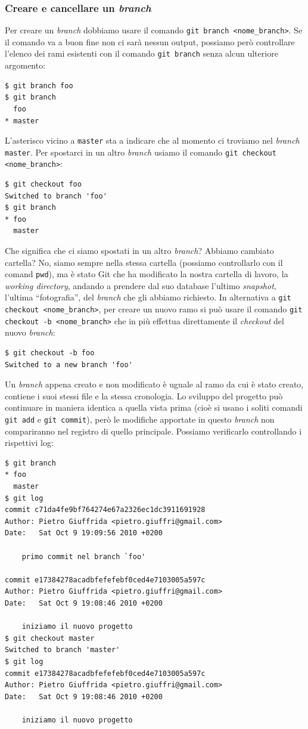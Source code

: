 \documentclass[a4paper,12pt,oneside]{article}
\begin{document}
\subsubsection{Creare e cancellare un \emph{branch}}
Per creare un \emph{branch} dobbiamo usare il comando
\lstinline|git branch <nome_branch>|. Se il comando va a buon fine non ci sarà
nessun output, possiamo però controllare l'elenco dei rami esistenti con il comando
\lstinline|git branch| senza alcun ulteriore argomento:
\begin{lstlisting}
$ git branch foo
$ git branch
  foo
* master
\end{lstlisting}
L'asterisco vicino a \lstinline|master| sta a indicare che al momento ci troviamo
nel \emph{branch} \lstinline|master|. Per spostarci in un altro \emph{branch}
usiamo il comando \lstinline|git checkout <nome_branch>|:
\begin{lstlisting}
$ git checkout foo
Switched to branch 'foo'
$ git branch
* foo
  master
\end{lstlisting}
Che significa che ci siamo spostati in un altro \emph{branch}? Abbiamo cambiato
cartella? No, siamo sempre nella stessa cartella (possiamo controllarlo con il
comand \lstinline|pwd|), ma è stato Git che ha modificato la nostra cartella di
lavoro, la \emph{working directory}, andando a prendere dal suo database l'ultimo
\emph{snapshot}, l'ultima ``fotografia'', del \emph{branch} che gli abbiamo
richiesto. In alternativa a \lstinline|git checkout <nome_branch>|, per creare
un nuovo ramo si può usare il comando \lstinline|git checkout -b <nome_branch>|
che in più effettua direttamente il \emph{checkout} del nuovo \emph{branch}:
\begin{lstlisting}
$ git checkout -b foo
Switched to a new branch 'foo'
\end{lstlisting}

Un \emph{branch} appena creato e non modificato è uguale al ramo da cui è stato
creato, contiene i suoi stessi file e la stessa cronologia. Lo sviluppo del progetto
può continuare in maniera identica a quella vista prima (cioè si usano i soliti
comandi \lstinline|git add| e \lstinline|git commit|), però le modifiche apportate
in questo \emph{branch} non compariranno nel registro di quello principale. Possiamo
verificarlo controllando i rispettivi log:
\begin{lstlisting}
$ git branch
* foo
  master
$ git log
commit c71da4fe9bf764274e67a2326ec1dc3911691928
Author: Pietro Giuffrida <pietro.giuffri@gmail.com>
Date:   Sat Oct 9 19:09:56 2010 +0200

    primo commit nel branch `foo'

commit e17384278acadbfefefebf0ced4e7103005a597c
Author: Pietro Giuffrida <pietro.giuffri@gmail.com>
Date:   Sat Oct 9 19:08:46 2010 +0200

    iniziamo il nuovo progetto
$ git checkout master
Switched to branch 'master'
$ git log
commit e17384278acadbfefefebf0ced4e7103005a597c
Author: Pietro Giuffrida <pietro.giuffri@gmail.com>
Date:   Sat Oct 9 19:08:46 2010 +0200

    iniziamo il nuovo progetto
\end{lstlisting}
\end{document}
